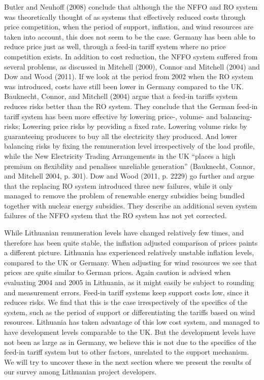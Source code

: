 \documentclass[a4paper, 12pt]{article}
\begin{document}
Butler and Neuhoff (2008) conclude that although the the NFFO and RO system was theoretically thought of as systems that effectively reduced costs through price competition, when the period of support, inflation, and wind resources are taken into account, this does not seem to be the case. Germany has been able to reduce price just as well, through a feed-in tariff system where no price competition exists. In addition to cost reduction, the NFFO system suffered from several problems, as discussed in Mitchell (2000), Connor and Mitchell (2004) and Dow and Wood (2011). If we look at the period from 2002 when the RO system was introduced, costs have still been lower in Germany compared to the UK. Bauknecht, Connor, and Mitchell (2004) argue that a feed-in tariffs system reduces risks better than the RO system. They conclude that the German feed-in tariff system has been more effective by lowering price-, volume- and balancing-risks; Lowering price risks by providing a fixed rate. Lowering volume risks by guaranteeing producers to buy all the electricity they produced. And lower balancing risks by fixing the remuneration level irrespectively of the load profile, while the New Electricity Trading Arrangements in the UK ``places a high premium on flexibility and penalises unreliable generation'' (Bauknecht, Connor, and Mitchell 2004, p. 301). Dow and Wood (2011, p. 2229) go further and argue that the replacing RO system introduced three new failures, while it only managed to remove the problem of renewable energy subsidies being bundled together with nuclear energy subsidies. They describe an additional seven system failures of the NFFO system that the RO system has not yet corrected.

While Lithuanian remuneration levels have changed relatively few times, and therefore  has been quite stable, the inflation adjusted comparison of prices paints a different picture. Lithuania has experienced relatively unstable inflation levels, compared to the UK or Germany. When adjusting for wind resources we see that prices are quite similar to German prices. Again caution is advised when evaluating 2004 and 2005 in Lithuania, as it might easily be subject to rounding and measurement errors. Feed-in tariff systems keep support costs low, since it reduces risks. We find that this is the case irrespectively of the specifics of the system, such as the period of support or differentiating the tariffs based on wind resources. Lithuania has taken advantage of this low cost system, and managed to have development levels comparable to the UK. But the development levels have not been as large as in Germany, we believe this is not due to the specifics of the feed-in tariff system but to other factors, unrelated to the support mechanism. We will try to uncover these in the next section where we present the results of our survey among Lithuanian project developers.
\end{document}
